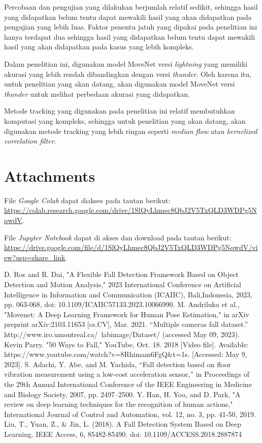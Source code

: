 \documentclass[conference]{IEEEtran}
\begin{document}
Percobaan dan pengujian yang dilakukan berjumlah relatif sedikit, sehingga hasil yang didapatkan belum tentu dapat mewakili hasil yang akan didapatkan pada pengujian yang lebih luas. Faktor penentu jatuh yang dipakai pada penelitian ini hanya terdapat dua sehingga hasil yang didapatkan belum tentu dapat mewakili hasil yang akan didapatkan pada kasus yang lebih kompleks.

Dalam penelitian ini, digunakan model MoveNet versi \textit{lightning} yang memiliki akurasi yang lebih rendah dibandingkan dengan versi \textit{thunder}. Oleh karena itu, untuk penelitian yang akan datang, akan digunakan model MoveNet versi \textit{thunder} untuk melihat perbedaan akurasi yang didapatkan.

Metode tracking yang digunakan pada penelitian ini relatif membutuhkan komputasi yang kompleks, sehingga untuk penelitian yang akan datang, akan digunakan metode tracking yang lebih ringan seperti \textit{median flow} atau \textit{kernelized correlation filter}.

\section{Attachments}
File \textit{Google Colab} dapat diakses pada tautan berikut: \url{https://colab.research.google.com/drive/1SlQyLhmec8QbJ2V5TxQLD3WDPg5NqwdV}.

File \textit{Jupyter Notebook} dapat di akses dan download pada tautan berikut: \url{https://drive.google.com/file/d/1SlQyLhmec8QbJ2V5TxQLD3WDPg5NqwdV/view?usp=share_link}.

\begin{thebibliography}{00}
 D. Ros and R. Dai, "A Flexible Fall Detection Framework Based on Object Detection and Motion Analysis," 2023 International Conference on Artificial Intelligence in Information and Communication (ICAIIC), Bali,Indonesia, 2023, pp. 063-068, doi: 10.1109/ICAIIC57133.2023.10066990.
 M. Andriluka et al., "Movenet: A Deep Learning Framework for Human Pose Estimation," in arXiv preprint arXiv:2103.11653 [cs.CV], Mar. 2021.
 “Multiple cameras fall dataset.” http://www.iro.umontreal.ca/~labimage/Dataset/ (accessed May 09, 2023).
 Kevin Parry. "50 Ways to Fall," YouTube, Oct. 18. 2018 [Video file]. Available: https://www.youtube.com/watch?v=8Rhimam6FgQ\&t=1s. [Accessed: May 9, 2023].
 S. Adachi, Y. Abe, and M. Yachida, “Fall detection based on floor vibration measurement using a low-cost acceleration sensor,” in Proceedings of the 29th Annual International Conference of the IEEE Engineering in Medicine and Biology Society, 2007, pp. 2497–2500.
 Y. Han, H. Yoo, and D. Park, "A review on deep learning techniques for the recognition of human actions," International Journal of Control and Automation, vol. 12, no. 3, pp. 41-50, 2019.
 Liu, T., Yuan, Z., \& Jin, L. (2018). A Fall Detection System Based on Deep Learning. IEEE Access, 6, 85482-85490. doi: 10.1109/ACCESS.2018.2887874

\end{thebibliography}
\end{document}
